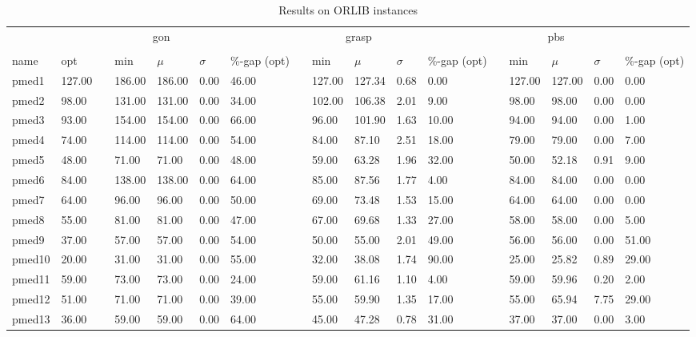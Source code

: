 \begin{table}[H]
    \caption{Results on ORLIB instances}\label{table:orlib_cost}
    \tiny
    \begin{tabularx}{\textwidth}{XXlXXXXlXXXXlXXXX}
    \firsthline
    \multicolumn{2}{c}{Instance}& \quad & \multicolumn{4}{c}{gon}& \quad & \multicolumn{4}{c}{grasp}& \quad & \multicolumn{4}{c}{pbs}\\
    \cline{1-2} \cline{4-7} \cline{9-12} \cline{14-17}\\
    name & opt && min & $\mu$ & $\sigma$ & \%-gap (opt) && min & $\mu$ & $\sigma$ & \%-gap (opt) && min & $\mu$ & $\sigma$ & \%-gap (opt)\\
    \hline
    pmed1 & 127.00 && 186.00 & 186.00 & 0.00 & 46.00 && 127.00 & 127.34 & 0.68 & 0.00 && 127.00 & 127.00 & 0.00 & 0.00\\
    pmed2 & 98.00 && 131.00 & 131.00 & 0.00 & 34.00 && 102.00 & 106.38 & 2.01 & 9.00 && 98.00 & 98.00 & 0.00 & 0.00\\
    pmed3 & 93.00 && 154.00 & 154.00 & 0.00 & 66.00 && 96.00 & 101.90 & 1.63 & 10.00 && 94.00 & 94.00 & 0.00 & 1.00\\
    pmed4 & 74.00 && 114.00 & 114.00 & 0.00 & 54.00 && 84.00 & 87.10 & 2.51 & 18.00 && 79.00 & 79.00 & 0.00 & 7.00\\
    pmed5 & 48.00 && 71.00 & 71.00 & 0.00 & 48.00 && 59.00 & 63.28 & 1.96 & 32.00 && 50.00 & 52.18 & 0.91 & 9.00\\
    pmed6 & 84.00 && 138.00 & 138.00 & 0.00 & 64.00 && 85.00 & 87.56 & 1.77 & 4.00 && 84.00 & 84.00 & 0.00 & 0.00\\
    pmed7 & 64.00 && 96.00 & 96.00 & 0.00 & 50.00 && 69.00 & 73.48 & 1.53 & 15.00 && 64.00 & 64.00 & 0.00 & 0.00\\
    pmed8 & 55.00 && 81.00 & 81.00 & 0.00 & 47.00 && 67.00 & 69.68 & 1.33 & 27.00 && 58.00 & 58.00 & 0.00 & 5.00\\
    pmed9 & 37.00 && 57.00 & 57.00 & 0.00 & 54.00 && 50.00 & 55.00 & 2.01 & 49.00 && 56.00 & 56.00 & 0.00 & 51.00\\
    pmed10 & 20.00 && 31.00 & 31.00 & 0.00 & 55.00 && 32.00 & 38.08 & 1.74 & 90.00 && 25.00 & 25.82 & 0.89 & 29.00\\
    pmed11 & 59.00 && 73.00 & 73.00 & 0.00 & 24.00 && 59.00 & 61.16 & 1.10 & 4.00 && 59.00 & 59.96 & 0.20 & 2.00\\
    pmed12 & 51.00 && 71.00 & 71.00 & 0.00 & 39.00 && 55.00 & 59.90 & 1.35 & 17.00 && 55.00 & 65.94 & 7.75 & 29.00\\
    pmed13 & 36.00 && 59.00 & 59.00 & 0.00 & 64.00 && 45.00 & 47.28 & 0.78 & 31.00 && 37.00 & 37.00 & 0.00 & 3.00\\

\end{tabularx}
\end{table}
